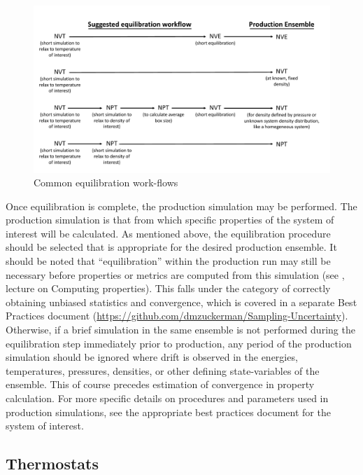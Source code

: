\documentclass[9pt,bestpractices]{livecoms}
\begin{document}
\begin{figure}[h]
\centering
\includegraphics[width=\linewidth]{Equilibration_Workflow.pdf}
\caption{Common equilibration work-flows}
\label{eqworkflow}
\end{figure}

Once equilibration is complete, the production simulation may be performed.
The production simulation is that from which specific properties of the system of interest will be calculated.
As mentioned above, the equilibration procedure should be selected that is appropriate for the desired production ensemble.
It should be noted that ``equilibration'' within the production run may still be necessary before properties or metrics are computed from this simulation (see \citet{ShellNotes}, lecture on Computing properties).
This falls under the category of correctly obtaining unbiased statistics and convergence, which is covered in a separate Best Practices document (\url{https://github.com/dmzuckerman/Sampling-Uncertainty}). 
Otherwise, if a brief simulation in the same ensemble is not performed during the equilibration step immediately prior to production, any period of the production simulation should be ignored where drift is observed in the energies, temperatures, pressures, densities, or other defining state-variables of the ensemble.
This of course precedes estimation of convergence in property calculation.
For more specific details on procedures and parameters used in production simulations, see the appropriate best practices document for the system of interest.

\subsection{Thermostats}
\label{sec:thermostats}
\end{document}
